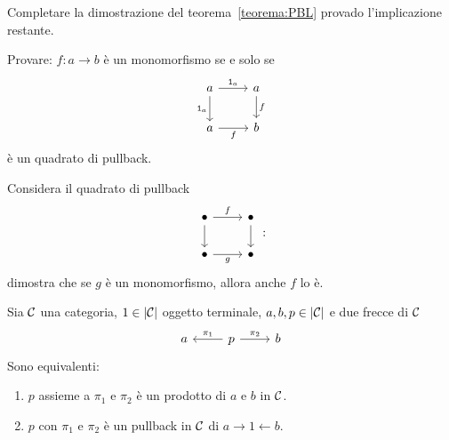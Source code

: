 \begin{esercizio}
Completare la dimostrazione del teorema~\ref{teorema:PBL} provado l'implicazione restante.
\end{esercizio}

\begin{esercizio}
Provare: \(f : a \to b\) è un monomorfismo se e solo se
\[\begin{tikzcd}
a \ar["{\id_a}", r] \ar["{\id_a}", d, swap] & a \ar["f", d] \\
a \ar["f", r, swap]                         & b
\end{tikzcd}\]
è un quadrato di pullback.
\end{esercizio}

\begin{esercizio}
Considera il quadrato di pullback
\[\begin{tikzcd}
\bullet \ar["f", r] \ar[d] & \bullet \ar[d] \\
\bullet \ar["g", r, swap]  & \bullet
\end{tikzcd}:\]
dimostra che se \(g\) è un monomorfismo, allora anche \(f\) lo è.
\end{esercizio}

\begin{teorema}
Sia \(\mathcal C\) una categoria, \(1 \in \lvert\mathcal C\rvert\) oggetto terminale, \(a, b , p \in \lvert\mathcal C\rvert\) e due frecce  di \(\mathcal C\)
\[\begin{tikzcd}
a & p \ar["{\pi_1}", swap, l] \ar["{\pi_2}", r] & b
\end{tikzcd}\]
Sono equivalenti:
\begin{enumerate}
\item \(p\) assieme a \(\pi_1\) e \(\pi_2\) è un prodotto di \(a\) e \(b\) in \(\mathcal C\).
\item \(p\) con \(\pi_1\) e \(\pi_2\) è un pullback in \(\mathcal C\) di \(a \to 1 \gets b\).
\end{enumerate}
\end{teorema}

